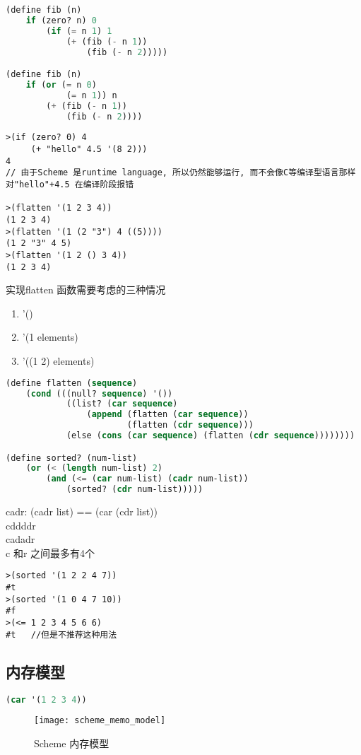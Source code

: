 \documentclass{article}
\begin{document}
\begin{lstlisting}[language = Lisp]
(define fib (n)
	if (zero? n) 0
		(if (= n 1) 1
			(+ (fib (- n 1))
				(fib (- n 2)))))

(define fib (n)
	if (or (= n 0)
			(= n 1)) n
		(+ (fib (- n 1))
			(fib (- n 2))))
\end{lstlisting}

\begin{verbatim}
>(if (zero? 0) 4
	 (+ "hello" 4.5 '(8 2)))
4
// 由于Scheme 是runtime language, 所以仍然能够运行, 而不会像C等编译型语言那样对"hello"+4.5 在编译阶段报错

>(flatten '(1 2 3 4))
(1 2 3 4)
>(flatten '(1 (2 "3") 4 ((5))))
(1 2 "3" 4 5)
>(flatten '(1 2 () 3 4))
(1 2 3 4)
\end{verbatim}

实现flatten 函数需要考虑的三种情况
\begin{enumerate}
	\item '()
	\item '(1 elements)
	\item '((1 2) elements)
\end{enumerate}

\begin{lstlisting}[language = Lisp]
(define flatten (sequence)
	(cond (((null? sequence) '())
			((list? (car sequence)
				(append (flatten (car sequence))
						(flatten (cdr sequence)))
			(else (cons (car sequence) (flatten (cdr sequence))))))))

(define sorted? (num-list)
	(or (< (length num-list) 2)
		(and (<= (car num-list) (cadr num-list))
			(sorted? (cdr num-list)))))
\end{lstlisting}

\bigskip\noindent
cadr: (cadr list) == (car (cdr list))\\
cddddr\\
cadadr\\
c 和r 之间最多有4个

\begin{verbatim}
>(sorted '(1 2 2 4 7))
#t
>(sorted '(1 0 4 7 10))
#f
>(<= 1 2 3 4 5 6 6)
#t   //但是不推荐这种用法
\end{verbatim}

\subsection{内存模型}
\begin{lstlisting}[language = Lisp]
(car '(1 2 3 4))
\end{lstlisting}
\begin{figure}[htbp]
	\centering
	\texttt{[image: scheme\_memo\_model]}\\
	\caption{Scheme 内存模型}\label{fig.scheme.memo.model}
\end{figure}
\end{document}
